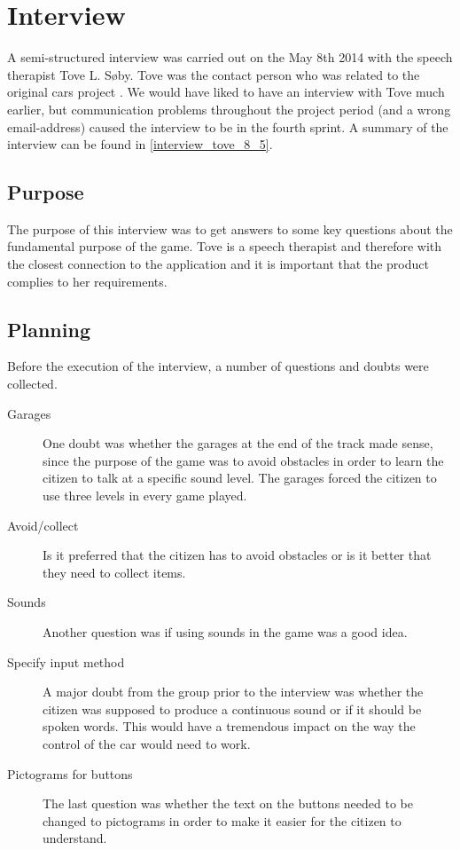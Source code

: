 \section{Interview}\label{s4_interview}

A semi-structured interview \cite{deb} was carried out on the May 8th 2014 with the speech therapist Tove L. Søby.
Tove was the contact person who was related to the original cars project \cite{oldcars}.
We would have liked to have an interview with Tove much earlier, but communication problems throughout the project period (and a wrong email-address) caused the interview to be in the fourth sprint.
A summary of the interview can be found in \cref{interview_tove_8_5}.

\subsection{Purpose}
The purpose of this interview was to get answers to some key questions about the fundamental purpose of the game. 
Tove is a speech therapist and therefore with the closest connection to the application and it is important that the product complies to her requirements.

\subsection{Planning}
Before the execution of the interview, a number of questions and doubts were collected.

\begin{description}
\item[Garages] One doubt was whether the garages at the end of the track made sense, since the purpose of the game was to avoid obstacles in order to learn the citizen to talk at a specific sound level.
The garages forced the citizen to use three levels in every game played.

\item[Avoid/collect] Is it preferred that the citizen has to avoid obstacles or is it better that they need to collect items. 

\item[Sounds] Another question was if using sounds in the game was a good idea.

\item[Specify input method] A major doubt from the group prior to the interview was whether the citizen was supposed to produce a continuous sound or if it should be spoken words.
This would have a tremendous impact on the way the control of the car would need to work.

\item[Pictograms for buttons] The last question was whether the text on the buttons needed to be changed to pictograms in order to make it easier for the citizen to understand.
\end{description}

